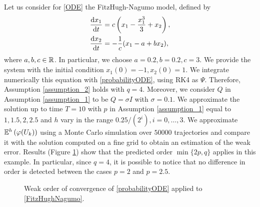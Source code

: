 Let us consider for \eqref{ODE} the FitzHugh-Nagumo model, defined by
\begin{equation}\label{FitzHughNagumo}
\begin{aligned}
	\dv{x_1}{t} &= c\left(x_1 - \frac{x_1^3}{3} + x_2\right), \\
	\dv{x_2}{t} &= -\frac{1}{c}(x_1 - a + bx_2),
\end{aligned}
\end{equation}
where $a, b, c \in \mathbb{R}$. In particular, we choose $a = 0.2, b = 0.2, c = 3$. We provide the system with the initial condition $x_1(0) = -1, x_2(0) = 1$. We integrate numerically this equation with \eqref{probabilityODE}, using RK4 as $\Psi$. Therefore, Assumption \ref{assumption_2} holds with $q = 4$. Moreover, we consider $Q$ in Assumption \ref{assumption_1} to be $Q = \sigma I$ with $\sigma = 0.1$. We approximate the solution up to time $T = 10$ with $p$ in Assumption \ref{assumption_1} equal to $1, 1.5, 2, 2.5$  and $h$ vary in the range $0.25 / (2^i), i = 0, \ldots, 3$. We approximate $\mathbb{E}^h\left(\varphi(U_k)\right)$ using a Monte Carlo simulation over $50000$ trajectories and compare it with the solution computed on a fine grid to obtain an estimation of the weak error. Results (Figure \ref{fig:weakorder}) show that the predicted order $\min\{2p, q\}$ applies in this example. In particular, since $q = 4$, it is possible to notice that no difference in order is detected between the cases $p = 2$ and $p = 2.5$. 

\begin{figure}
\centering
\resizebox{0.6\linewidth}{!}{}
\caption{Weak order of convergence of \eqref{probabilityODE} applied to \eqref{FitzHughNagumo}.}
\label{fig:weakorder}
\end{figure}